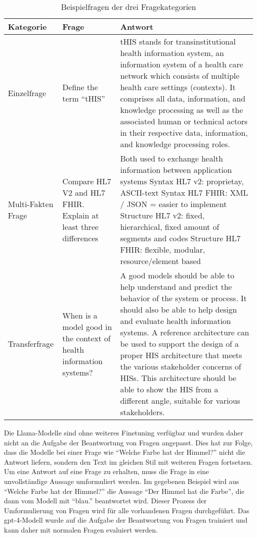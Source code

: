 \begin{table}
    \begin{tabularx}{\textwidth}{p{2.5cm}p{3cm}X}
        \toprule
        \textbf{Kategorie} & \textbf{Frage} & \textbf{Antwort} \\
        \midrule
        Einzelfrage & Define the term \enquote{tHIS} &  tHIS stands for transinstitutional health information system, an information system of a health care network which consists of multiple health care settings (contexts). It comprises all data, information, and knowledge processing as well as the associated human or technical actors in their respective data, information, and knowledge processing roles. \\
        Multi-Fakten Frage & Compare HL7 V2 and HL7 FHIR. Explain at least three differences & Both used to exchange health information between application systems\newline
        Syntax HL7 v2: proprietay, ASCII-text\newline
        Syntax HL7 FHIR: XML / JSON  = easier to implement\newline
        Structure HL7 v2: fixed, hierarchical, fixed amount of segments and codes\newline
        Structure HL7 FHIR: flexible, modular, resource/element based \\
        Transferfrage & When is a model good in the context of health information systems? & A good models should be able to help understand and predict the behavior of the system or process. It should also be able to help design and evaluate health information systems. A reference architecture can be used to support the design of a proper HIS architecture that meets the various stakeholder concerns of HISs. This architecture should be able to show the HIS from a different angle, suitable for various stakeholders. \\
        \bottomrule
    \end{tabularx}
    \caption[Beispielfragen der drei Kategorien]{Beispielfragen der drei Fragekategorien}\label{tab:question-category}
\end{table}

Die Llama-Modelle sind ohne weiteres Finetuning verfügbar und wurden daher nicht an die Aufgabe der Beantwortung von Fragen angepasst.
Dies hat zur Folge, dass die Modelle bei einer Frage wie \enquote{Welche Farbe hat der Himmel?} nicht die Antwort liefern, sondern den Text im gleichen Stil mit weiteren Fragen fortsetzen.
Um eine Antwort auf eine Frage zu erhalten, muss die Frage in eine unvollständige Aussage umformuliert werden.
Im gegebenen Beispiel wird aus \enquote{Welche Farbe hat der Himmel?} die Aussage \enquote{Der Himmel hat die Farbe}, die dann vom Modell mit \enquote{blau.} beantwortet wird.
Dieser Prozess der Umformulierung von Fragen wird für alle vorhandenen Fragen durchgeführt.
Das \ac{gpt}-4-Modell wurde auf die Aufgabe der Beantwortung von Fragen trainiert und kann daher mit normalen Fragen evaluiert werden.\\

